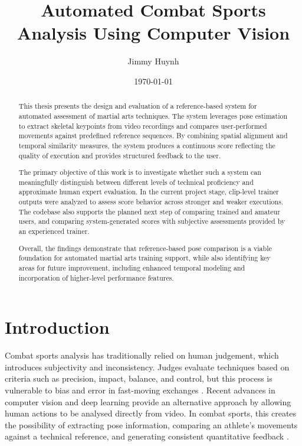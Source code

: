 \documentclass[12pt]{article}
\title{Automated Combat Sports Analysis Using Computer Vision}
\author{Jimmy Huynh}
\date{\today}
\begin{document}
\maketitle

\newpage

\begin{abstract}
This thesis presents the design and evaluation of a reference-based system for automated assessment of martial arts techniques. The system leverages pose estimation to extract skeletal keypoints from video recordings and compares user-performed movements against predefined reference sequences. By combining spatial alignment and temporal similarity measures, the system produces a continuous score reflecting the quality of execution and provides structured feedback to the user.

The primary objective of this work is to investigate whether such a system can meaningfully distinguish between different levels of technical proficiency and approximate human expert evaluation. In the current project stage, clip-level trainer outputs were analyzed to assess score behavior across stronger and weaker executions. The codebase also supports the planned next step of comparing trained and amateur users, and comparing system-generated scores with subjective assessments provided by an experienced trainer.

Overall, the findings demonstrate that reference-based pose comparison is a viable foundation for automated martial arts training support, while also identifying key areas for future improvement, including enhanced temporal modeling and incorporation of higher-level performance features.
\end{abstract}

\newpage

\section{Introduction}
Combat sports analysis has traditionally relied on human judgement, which introduces subjectivity and inconsistency. Judges evaluate techniques based on criteria such as precision, impact, balance, and control, but this process is vulnerable to bias and error in fast-moving exchanges \cite{quinn2024automation}. Recent advances in computer vision and deep learning provide an alternative approach by allowing human actions to be analysed directly from video. In combat sports, this creates the possibility of extracting pose information, comparing an athlete's movements against a technical reference, and generating consistent quantitative feedback \cite{wu2024sthka,echeverria2021pose}.
\end{document}
